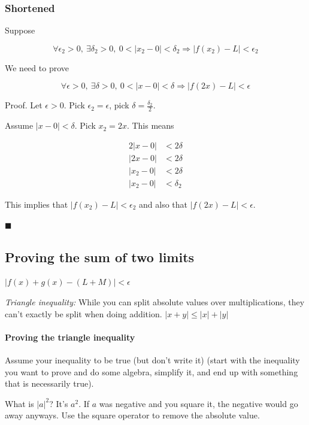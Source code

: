 \documentclass[
]{article}
\begin{document}
\subsubsection{Shortened}

Suppose

$$\forall\epsilon_{2} > 0,\ \exists\delta_{2} > 0,\ 0 < \left| x_{2} - 0 \right| < \delta_{2} \Rightarrow \left| f\left( x_{2} \right) - L \right| < \epsilon_{2}$$

We need to prove

$$\forall\epsilon > 0,\ \exists\delta > 0,\ 0 < |x - 0| < \delta \Rightarrow \left| f(2x) - L \right| < \epsilon$$

Proof. Let $\epsilon > 0$. Pick $\epsilon_{2} = \epsilon$, pick
$\delta = \frac{\delta_{2}}{2}$.

Assume $|x - 0| < \delta$. Pick $x_{2} = 2x$. This means

\begin{align*}
2|x - 0| &< 2\delta
 \\
|2x - 0| &< 2\delta
 \\
\left| x_{2} - 0 \right| &< 2\delta
 \\
\left| x_{2} - 0 \right| &< \delta_{2}
\end{align*}


This implies that
$\left| f\left( x_{2} \right) - L \right| < \epsilon_{2}$ and also
that $\left| f(2x) - L \right| < \epsilon$.

$\blacksquare$


\subsection{Proving the sum of two
limits}

$\left| f(x) + g(x) - (L + M) \right| < \epsilon$

\emph{Triangle inequality:} While you can split absolute values over
multiplications, they can't exactly be split when doing addition.
$|x + y| \leq |x| + |y|$


\paragraph{Proving the triangle
inequality}

Assume your inequality to be true (but don't write it) (start with the
inequality you want to prove and do some algebra, simplify it, and end
up with something that is necessarily true).

What is $|a|^{2}$? It's $a^{2}$. If $a$ was negative and you
square it, the negative would go away anyways. Use the square operator
to remove the absolute value.
\end{document}
